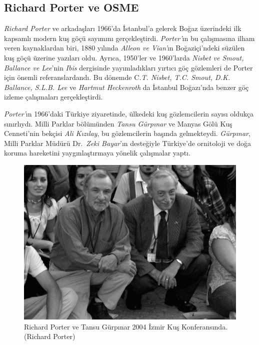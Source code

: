 \documentclass[
  a4paper,
  DIV=11,
  numbers=noendperiod]{scrreprt}
\begin{document}
\subsection*{Richard Porter ve OSME}\label{richard-porter-ve-osme}

\emph{Richard Porter} ve arkadaşları 1966'da İstanbul'a gelerek Boğaz
üzerindeki ilk kapsamlı modern kuş göçü sayımını gerçekleştirdi.
\emph{Porter'}ın bu çalışmasına ilham veren kaynaklardan biri, 1880
yılında \emph{Alleon ve Vian'}ın Boğaziçi'ndeki süzülen kuş göçü üzerine
yazıları oldu. Ayrıca, 1950'ler ve 1960'larda \emph{Nisbet ve Smout,}
\emph{Ballance ve Lee}'nin \emph{Ibis} dergisinde yayımladıkları yırtıcı
göç gözlemleri de Porter için önemli referanslardandı. Bu dönemde
C\emph{.T. Nisbet, T.C. Smout, D.K. Ballance, S.L.B. Lee} ve
\emph{Hartmut Heckenroth} da İstanbul Boğazı'nda benzer göç izleme
çalışmaları gerçekleştirdi.

\emph{Porter'}ın 1966'daki Türkiye ziyaretinde, ülkedeki kuş
gözlemcilerin sayısı oldukça sınırlıydı. Milli Parklar bölümünden
\emph{Tansu Gürpınar} ve Manyas Gölü Kuş Cenneti'nin bekçisi \emph{Ali
Kızılay}, bu gözlemcilerin başında gelmekteydi. \emph{Gürpınar}, Milli
Parklar Müdürü Dr.~\emph{Zeki Bayar}'ın desteğiyle Türkiye'de ornitoloji
ve doğa koruma hareketini yaygınlaştırmaya yönelik çalışmalar yaptı.

\begin{figure}[H]

{\centering \includegraphics{images/richard_tansu.gif}

}

\caption{Richard Porter ve Tansu Gürpınar 2004 İzmir Kuş Konferansında.
(Richard Porter)}

\end{figure}%
\end{document}
